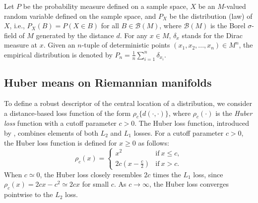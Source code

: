 \documentclass[preprint]{imsart}
\theoremstyle{plain}
\newtheorem{definition}{Definition}
\theoremstyle{remark}
\begin{document}
 Let $P$ be the probability measure defined on a sample space, $X$ be an $M$-valued random variable defined on the sample space, and $P_{X}$ be the distribution (law) of $X$, i.e., $P_{X}(B)=P(X \in B)$ for all $B \in \mathcal{B}(M)$, where $\mathcal{B}(M)$ is the Borel $\sigma$-field of $M$ generated by the distance $d$. For any $x \in M$, $\delta_{x}$ stands for the Dirac measure at $x$. Given an $n$-tuple of deterministic points $(x_{1}, x_{2}, ..., x_{n}) \in M^{n}$, the empirical distribution is denoted by  $P_{n} = \frac{1}{n}\sum_{i=1}^{n} \delta_{x_{i}}$. 


\subsection{Huber means on Riemannian manifolds} \label{subsec:Huber}








To define a robust descriptor of the central location of a distribution, we consider a distance-based loss function of the form $\rho_{c}\{d(\cdot, \cdot)\}$, where $\rho_{c}(\cdot)$ is the \textit{Huber loss} function with a cutoff parameter $c>0$.
%
The Huber loss function, introduced by \cite{huber1964robust}, combines elements of both $L_{2}$ and $L_{1}$ losses. For a cutoff parameter $c > 0$, the Huber loss function is defined for $x \ge 0$ as follows:
\[
\rho_{c}(x) = \begin{cases} x^2 & \mbox{if} ~ x \le c, \\ 
2c(x- \tfrac{c}{2}) &  \mbox{if} ~ x > c.
\end{cases}
\]
When $c \simeq 0$, the Huber loss closely resembles $2c$ times the $L_{1}$ loss, since $\rho_{c}(x) = 2cx - c^2 \simeq 2cx$ for small $c$. As $c \rightarrow \infty$, the Huber loss converges pointwise to the $L_{2}$ loss.
\end{document}
